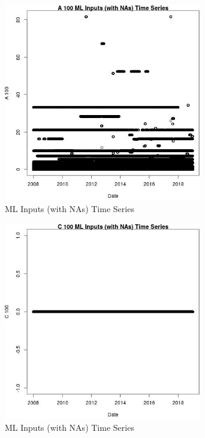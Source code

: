 \begin{figure} 
\centering  
\includegraphics[width=0.77\textwidth]{Code_Outputs/Report_ML_input_PM25_Step4_part_f_de_duplicated_aveswNAs_A_100vDate.jpg} 
\caption{\label{fig:Report_ML_input_PM25_Step4_part_f_de_duplicated_aveswNAsA_100vDate}ML Inputs (with NAs) Time Series} 
\end{figure} 
 

\begin{figure} 
\centering  
\includegraphics[width=0.77\textwidth]{Code_Outputs/Report_ML_input_PM25_Step4_part_f_de_duplicated_aveswNAs_C_100vDate.jpg} 
\caption{\label{fig:Report_ML_input_PM25_Step4_part_f_de_duplicated_aveswNAsC_100vDate}ML Inputs (with NAs) Time Series} 
\end{figure} 
 

